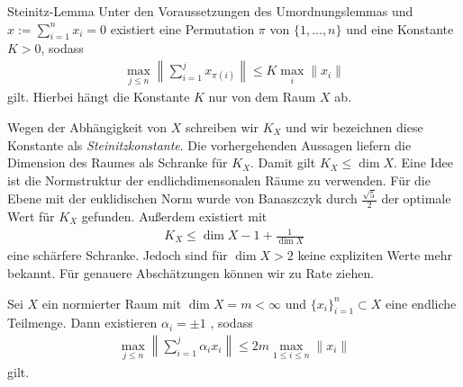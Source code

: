 \begin{genericthm}{Steinitz-Lemma}\label{th:steiniz_lemma}
	Unter den Voraussetzungen des Umordnungslemmas und
	$ x := \sum_{i = 1}^n x_i = 0$ existiert eine Permutation $ \pi $ von $ \{1,...,n\} $ und eine Konstante $ K > 0 $,
	sodass
	\begin{align*}
		\max \limits_{j \leq n} \left\|
		\sum \limits_{i = 1}^j
		x_{\pi(i)}
		\right\|
		\leq 
		K 
		\max \limits_{i} \| x_i\|
	\end{align*}
	gilt.
	Hierbei hängt die Konstante $ K $ nur von dem Raum $ X $ ab. 
\end{genericthm}

Wegen der Abhängigkeit von $ X $ schreiben wir $ K_X $ und wir bezeichnen diese Konstante als \textit{Steinitzkonstante}.
Die vorhergehenden Aussagen liefern die Dimension des Raumes als Schranke für $ K_X $. 
Damit gilt $ K_X \leq  \dim X $.
Eine Idee ist die Normstruktur der endlichdimensonalen Räume zu verwenden.
Für die Ebene mit der euklidischen Norm wurde von Banaszczyk\cite{Banaszczyk1987} durch $ \frac{\sqrt{5}}{2} $ der optimale Wert für $ K_X  $ gefunden. Außerdem existiert mit
\begin{align*}
	K_X \leq \dim X -1 + \frac{1}{\dim X}
\end{align*}
eine schärfere Schranke. Jedoch sind für $ \dim X > 2 $ keine expliziten Werte mehr bekannt.
Für genauere Abschätzungen können wir \cite{Banaszczyk1990} zu Rate ziehen.

\newpage
\begin{lem}\label{th:sign_inequality_finite_dim}
	Sei $ X $ ein normierter Raum mit $ \dim X = m < \infty $ und $ \{ x_i \}_{i = 1}^n \subset X $ eine endliche Teilmenge.
	Dann existieren $ \alpha_i = \pm 1 $   , sodass
	\begin{align}
		\max \limits_{j \leq n}
		\left\|
		\sum \limits_{i=1}^j \alpha_i x_i 		
		\right\|
		\leq 
		2 m \max \limits_{1 \leq i \leq n } \| x_i \|
	\end{align}
	gilt.
\end{lem}

